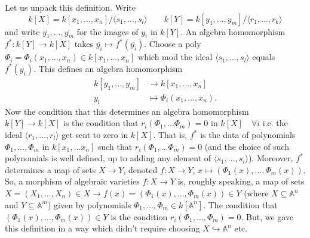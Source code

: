 \documentclass{article}
\newcommand{\A}{\mathbb{A}}
\begin{document}
Let us unpack this definition.
Write
\begin{equation*}
    k[X] = k[x_1, \dotsc, x_n] / \langle s_1, \dotsc, s_l \rangle \qquad k[Y] = k[y_1, \dotsc, y_m] / \langle r_1, \dotsc, r_k \rangle
\end{equation*}
and write $\overline{y_1}, \dotsc, \overline{y_m}$ for the images of $y_i$ in $k[Y]$.
An algebra homomorphism $f^*: k[Y] \to k[X]$ takes $\overline{y_i} \mapsto f^*(\overline{y_i})$.
Choose a poly $\Phi_i = \Phi_i(x_1, \dotsc, x_n) \in k[x_1, \dotsc, x_n]$ which mod the ideal $\langle s_1, \dotsc, s_l \rangle$ equals $f^*(\overline{y_i})$.
This defines an algebra homomorphism
\begin{align*}
    k[y_1, \dotsc, y_m] &\longrightarrow k[x_1, \dotsc, x_n] \\
    y_l &\mapsto \Phi_i(x_1, \dotsc, x_n).
\end{align*}
Now the condition that this determines an algebra homomorphism $k[Y] \to k[X]$ is the condition that $r_i(\Phi_1, \dotsc \Phi_m) = 0$ in $k[X] \quad \forall i$ i.e. the ideal $\langle r_1, \dotsc, r_l\rangle$ get sent to zero in $k[X]$.
That is, $f^*$ is the data of polynomials $\Phi_1, \dotsc, \Phi_m$ in $k[x_1, \dotsc x_n]$ such that $r_i(\Phi_1, \dotsc \Phi_m) = 0$ (and the choice of such polynomials is well defined, up to adding any element of $\langle s_1, \dotsc, s_i\rangle$).
Moreover, $f^*$ determines a map of sets $X \to Y$, denoted $f:X \to Y$, $x \mapsto (\Phi_1(x), \dotsc, \Phi_m(x))$.
So, a morphism of algebraic varieties $f: X \to Y$ is, roughly speaking, a map of sets $X = (X_1, \dotsc, X_n) \in X \longrightarrow f(x) = (\Phi_1(x), \dotsc, \Phi_m(x)) \in Y$ (where $X \subseteq \A^n$ and $Y \subseteq \A^m$) given by polynomials $\Phi_1, \dotsc, \Phi_m \in k[\A^n]$. The condition that $(\Phi_1(x), \dotsc, \Phi_m(x)) \in Y$ is the condition $r_i(\Phi_1, \dotsc, \Phi_m) = 0$.
But, we gave this definition in a way which didn't require choosing $X \hookrightarrow \A^n$ etc.
\end{document}
